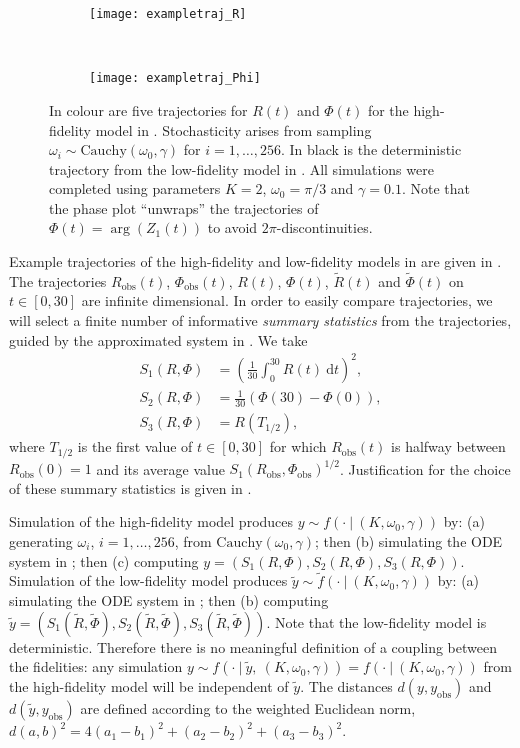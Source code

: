 \documentclass[12pt, onecolumn]{article}
\newcommand{\obs}[1]{#1_{\mathrm{obs}}}
\begin{document}
\begin{figure}
\centering
\begin{subfigure}[b]{0.48\textwidth}
 \texttt{[image: exampletraj\_R]}
\end{subfigure}
~
\begin{subfigure}[b]{0.48\textwidth}
 \texttt{[image: exampletraj\_Phi]}
\end{subfigure}
\caption{
In colour are five trajectories for $R(t)$ and $\Phi(t)$ for the high-fidelity model in . Stochasticity arises from sampling $\omega_i \sim \mathrm{Cauchy}(\omega_0, \gamma)$ for $i = 1,\dots, 256$. 
In black is the deterministic trajectory from the low-fidelity model in .
All simulations were completed using parameters $K=2$, $\omega_0 = \pi/3$ and $\gamma=0.1$.
Note that the phase plot ``unwraps'' the trajectories of $\Phi(t) = \arg(Z_1(t))$ to avoid $2\pi$-discontinuities. 
}
\label{fig:eg_dynamics}
\end{figure}

Example trajectories of the high-fidelity and low-fidelity models in  are given in .
The trajectories $\obs R(t)$, $\obs \Phi(t)$, $R(t)$, $\Phi(t)$, $\tilde R(t)$ and $\tilde \Phi(t)$ on $t \in [0,30]$ are infinite dimensional.
In order to easily compare trajectories, we will select a finite number of informative \emph{summary statistics} from the trajectories, guided by the approximated system in .
We take
\begin{align*}
S_1(R, \Phi) &= \left( \frac{1}{30} \int_0^{30} R(t) ~\mathrm dt \right)^2, \\
S_2(R, \Phi) &= \frac{1}{30} \left( \Phi(30) - \Phi(0) \right), \\
S_3(R, \Phi) &= R \left( T_{1/2} \right),
\end{align*}
where $T_{1/2}$ is the first value of $t \in [0,30]$ for which $\obs R(t)$ is halfway between $\obs R(0)=1$ and its average value $S_1(\obs R, \obs \Phi)^{1/2}$.
Justification for the choice of these summary statistics is given in .

Simulation of the high-fidelity model produces $y \sim f(\cdot~|~(K, \omega_0, \gamma))$ by: 
(a) generating $\omega_i$, $i=1,\dots,256$, from $\mathrm{Cauchy}(\omega_0, \gamma)$; then 
(b) simulating the ODE system in ; then 
(c) computing $y = (S_1(R, \Phi), S_2(R, \Phi), S_3(R, \Phi))$.
Simulation of the low-fidelity model produces $\tilde y \sim \tilde f(\cdot~|~(K, \omega_0, \gamma))$ by: 
(a) simulating the ODE system in ; then
(b) computing $\tilde y = (S_1(\tilde R, \tilde \Phi), S_2(\tilde R, \tilde \Phi), S_3(\tilde R, \tilde \Phi))$.
Note that the low-fidelity model is deterministic.
Therefore there is no meaningful definition of a coupling between the fidelities: any simulation $y \sim f(\cdot~|~\tilde y,~(K, \omega_0, \gamma)) = f(\cdot~|~(K, \omega_0, \gamma))$ from the high-fidelity model will be independent of $\tilde y$.
The distances $d(y, \obs y)$ and $d(\tilde y, \obs y)$ are defined according to the weighted Euclidean norm, $d(a,b)^2 = 4(a_1 - b_1)^2 + (a_2 - b_2)^2 + (a_3 - b_3)^2$.
\end{document}
